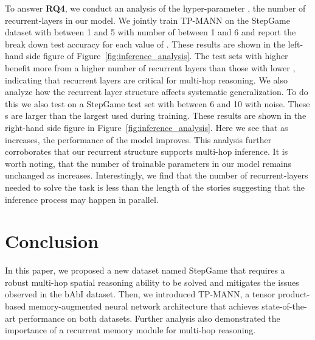 \documentclass[letterpaper]{article} \usepackage{aaai22}  \usepackage{times}  \usepackage{helvet}  \usepackage{courier}  \usepackage[hyphens]{url}  \usepackage{graphicx} \urlstyle{rm} \def\UrlFont{\rm}  \usepackage{natbib}  \usepackage{caption} \DeclareCaptionStyle{ruled}{labelfont=normalfont,labelsep=colon,strut=off} \frenchspacing  \setlength{\pdfpagewidth}{8.5in}  \setlength{\pdfpageheight}{11in}  \usepackage{algorithm}
\begin{document}
To answer \textbf{RQ4}, 
we conduct an analysis of the hyper-parameter , the number of recurrent-layers in our model. 
We jointly train TP-MANN on the StepGame dataset with  between 1 and 5 with number of  between 1 and 6 and report the break down test accuracy for each value of . 
These results are shown in the left-hand side figure of Figure~\ref{fig:inference_analysis}. 
The test sets with higher  benefit more from a higher number of recurrent layers than those with lower , indicating that recurrent layers are critical for multi-hop reasoning.
We also analyze how the recurrent layer structure affects systematic generalization. 
To do this we also test on a StepGame test set with  between 6 and 10 with noise. These s are larger than the largest  used during training.
These results are shown in the right-hand side figure in Figure~\ref{fig:inference_analysis}.
Here we see that as  increases, the performance of the model improves.
This analysis further corroborates that our recurrent structure supports multi-hop inference. 
It is worth noting, that the number of trainable parameters in our model remains unchanged as  increases. 
Interestingly, we find that the number of recurrent-layers needed to solve the task is less than the length of the stories  suggesting that the inference process may happen in parallel. 


 
\section{Conclusion}
In this paper, we proposed a new dataset named StepGame that requires a robust multi-hop spatial reasoning ability to be solved and mitigates the issues observed in the bAbI dataset. 
Then, we introduced TP-MANN, a tensor product-based memory-augmented neural network architecture that achieves state-of-the-art performance on both datasets. 
Further analysis also demonstrated the importance 
of a recurrent memory module for multi-hop reasoning.

 
\newpage

\end{document}
